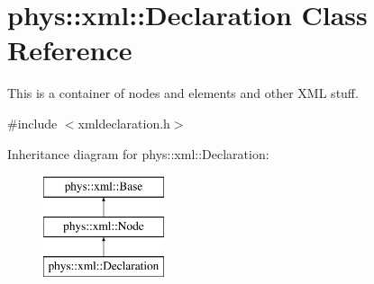 \hypertarget{classphys_1_1xml_1_1Declaration}{
\section{phys::xml::Declaration Class Reference}
\label{d7/d50/classphys_1_1xml_1_1Declaration}
}


This is a container of nodes and elements and other XML stuff.  




{\ttfamily \#include $<$xmldeclaration.h$>$}

Inheritance diagram for phys::xml::Declaration:\begin{figure}[H]
\begin{center}
\leavevmode
\includegraphics[height=3.000000cm]{d7/d50/classphys_1_1xml_1_1Declaration}
\end{center}
\end{figure}
